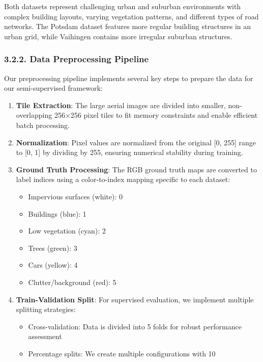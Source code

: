 \documentclass[conference]{IEEEtran}
\begin{document}
Both datasets represent challenging urban and suburban environments with complex building layouts, varying vegetation patterns, and different types of road networks. The Potsdam dataset features more regular building structures in an urban grid, while Vaihingen contains more irregular suburban structures.

\subsubsection*{3.2.2. Data Preprocessing Pipeline}

Our preprocessing pipeline implements several key steps to prepare the data for our semi-supervised framework:

\begin{enumerate}
    \item \textbf{Tile Extraction}: The large aerial images are divided into smaller, non-overlapping 256×256 pixel tiles to fit memory constraints and enable efficient batch processing.
    
    \item \textbf{Normalization}: Pixel values are normalized from the original [0, 255] range to [0, 1] by dividing by 255, ensuring numerical stability during training.
    
    \item \textbf{Ground Truth Processing}: The RGB ground truth maps are converted to label indices using a color-to-index mapping specific to each dataset:
    \begin{itemize}
        \item Impervious surfaces (white): 0
        \item Buildings (blue): 1
        \item Low vegetation (cyan): 2
        \item Trees (green): 3
        \item Cars (yellow): 4
        \item Clutter/background (red): 5
    \end{itemize}
    
    \item \textbf{Train-Validation Split}: For supervised evaluation, we implement multiple splitting strategies:
    \begin{itemize}
        \item Cross-validation: Data is divided into 5 folds for robust performance assessment
        \item Percentage splits: We create multiple configurations with 10%
    \end{itemize}
    

\end{enumerate}
\end{document}
